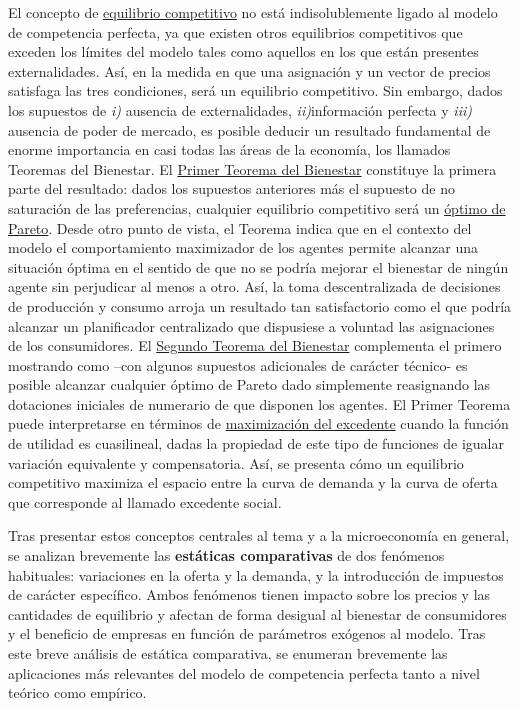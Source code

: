 \documentclass{nuevotema}
\begin{document}
El concepto de \underline{equilibrio competitivo} no está indisolublemente ligado al modelo de competencia perfecta, ya que existen otros equilibrios competitivos que exceden los límites del modelo tales como aquellos en los que están presentes externalidades. Así, en la medida en que una asignación y un vector de precios satisfaga las tres condiciones, será un equilibrio competitivo. Sin embargo, dados los supuestos de \textit{i)} ausencia de externalidades, \textit{ii)}información perfecta y \textit{iii)} ausencia de poder de mercado, es posible deducir un resultado fundamental de enorme importancia en casi todas las áreas de la economía, los llamados Teoremas del Bienestar. El \underline{Primer Teorema del Bienestar} constituye la primera parte del resultado: dados los supuestos anteriores más el supuesto de no saturación de las preferencias, cualquier equilibrio competitivo será un \underline{óptimo de Pareto}. Desde otro punto de vista, el Teorema indica que en el contexto del modelo el comportamiento maximizador de los agentes permite alcanzar una situación óptima en el sentido de que no se podría mejorar el bienestar de ningún agente sin perjudicar al menos a otro. Así, la toma descentralizada de decisiones de producción y consumo arroja un resultado tan satisfactorio como el que podría alcanzar un planificador centralizado que dispusiese a voluntad las asignaciones de los consumidores. El \underline{Segundo Teorema del Bienestar} complementa el primero mostrando como --con algunos supuestos adicionales de carácter técnico- es posible alcanzar cualquier óptimo de Pareto dado simplemente reasignando las dotaciones iniciales de numerario de que disponen los agentes. El Primer Teorema puede interpretarse en términos de \underline{maximización del excedente} cuando la función de utilidad es cuasilineal, dadas la propiedad de este tipo de funciones de igualar variación equivalente y compensatoria. Así, se presenta cómo un equilibrio competitivo maximiza el espacio entre la curva de demanda y la curva de oferta que corresponde al llamado excedente social.

Tras presentar estos conceptos centrales al tema y a la microeconomía en general, se analizan brevemente las \textbf{estáticas comparativas} de dos fenómenos habituales: variaciones en la oferta y la demanda, y la introducción de impuestos de carácter específico. Ambos fenómenos tienen impacto sobre los precios y las cantidades de equilibrio y afectan de forma desigual al bienestar de consumidores y el beneficio de empresas en función de parámetros exógenos al modelo. Tras este breve análisis de estática comparativa, se enumeran brevemente las aplicaciones más relevantes del modelo de competencia perfecta tanto a nivel teórico como empírico.
\end{document}
